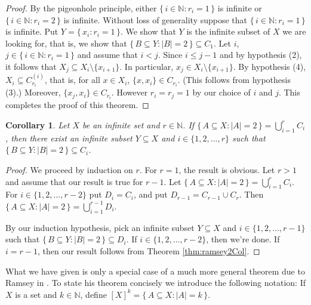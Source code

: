 \documentclass[12pt]{article}
\theoremstyle{plain}
\newtheorem{cor}[thm]{Corollary}
\theoremstyle{definition}
\newcommand{\bbN}{\mathbb{N}}
\begin{document}
\begin{proof}
  By the pigeonhole principle, either $\{\, i \in \bbN : r_i = 1 \,\}$
  is infinite or $\{\, i \in \bbN : r_i = 2 \,\}$ is infinite.
  Without loss of generality suppose that $\{\, i \in \bbN : r_i =
  1\,\}$ is infinite.
  Put $Y = \{\, x_i : r_i = 1 \,\}$.
  We show that $Y$ is the infinite subset of $X$ we are looking for,
  that is, we show that $\{\, B \subseteq Y : |B| = 2 \,\} \subseteq
  C_1$.  
  Let $i$, $j \in \{\, i \in \bbN : r_i = 1 \,\}$ and assume that $i <
  j$.
  Since $i \le j-1$ and by hypothesis (2), it follows that $X_j
  \subseteq X_{i} \setminus \{x_{i+1}\}$. 
  In particular, $x_j \in X_i \setminus \{x_{i+1}\}$.
  By hypothesis (4), $X_i \subseteq C_{r_i}^{(i)}$, that is, for all
  $x \in X_i$, $\{x, x_i\} \in C_{r_i}$. 
  (This follows from hypothesis (3).)
  Moreover, $\{x_j, x_i\} \in C_{r_i}$. 
  However $r_i = r_j = 1$ by our choice of $i$ and $j$.
  This completes the proof of this theorem.
\end{proof}
\begin{cor}
  \label{cor:ramseyrCol}
  Let $X$ be an infinite set and $r \in \bbN$.
  If $\{\, A \subseteq X : |A| = 2 \,\} = \bigcup_{i=1}^r C_i$, then
  there exist an infinite subset $Y \subseteq X$ and $i \in \{1, 2,
  \ldots, r\}$ such that $\{\, B \subseteq Y : |B| = 2 \,\} \subseteq
  C_i$.
\end{cor}
\begin{proof}
  We proceed by induction on $r$.
  For $r = 1$, the result is obvious.
  Let $r > 1$ and assume that our result is true for $r-1$.
  Let $\{\, A \subseteq X : |A| = 2 \,\} = \bigcup_{i=1}^r C_i$.
  For $i \in \{1, 2, \ldots, r-2\}$ put $D_i = C_i$, and put $D_{r-1}
  = C_{r-1} \cup C_r$.
  Then $\{\, A \subseteq X : |A| = 2 \,\} = \bigcup_{i=1}^{r-1} D_i$. 
  
  By our induction hypothesis, pick an infinite subset $Y \subseteq
  X$ and  $i \in \{1, 2, \ldots, r-1\}$ such that $\{\, B \subseteq Y
  : |B| = 2 \,\} \subseteq D_i$.
  If $i \in \{1, 2, \ldots, r-2\}$, then we're done.
  If $i = r-1$, then our result follows from Theorem
  \ref{thm:ramsey2Col}.
\end{proof}

What we have given is only a special case of a much more general
theorem due to Ramsey in \cite[Theorem A]{Ramsey:1930uq}.
To state his theorem concisely we introduce the following notation: If
$X$ is a set and $k \in \bbN$, define $[X]^k = \{\, A \subseteq X :
|A| = k \,\}$.
\end{document}
